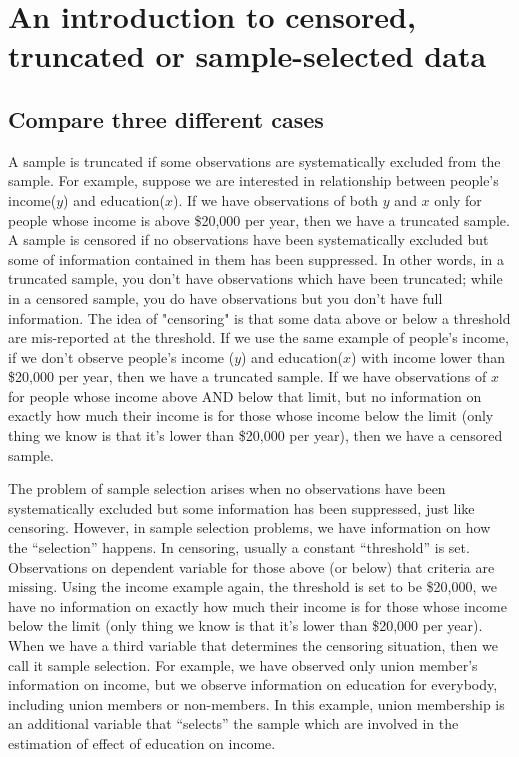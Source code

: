 \chapter{An introduction to censored, truncated or sample-selected data}

\section{Compare three different cases}


A sample is truncated if some observations are systematically excluded
from the sample.  For example, suppose we are interested in
relationship between people's income($y$) and education($x$).  If we
have observations of both $y$ and $x$ only for people whose income is
above \$20,000 per year, then we have a truncated sample.  A sample is
censored if no observations have been systematically excluded but some
of information contained in them has been suppressed.  In other words,
in a truncated sample, you don't have observations which have been
truncated; while in a censored sample, you do have observations but
you don't have full information.  The idea of "censoring" is that some
data above or below a threshold are mis-reported at the threshold.  If
we use the same example of people's income, if we don't observe
people's income ($y$) and education($x$) with income lower than
\$20,000 per year, then we have a truncated sample.  If we have
observations of $x$ for people whose income above AND below that
limit, but no information on exactly how much their income is for
those whose income below the limit (only thing we know is that it's
lower than \$20,000 per year), then we have a censored sample.



The problem of sample selection arises when no observations have been
systematically excluded but some information has been suppressed, just
like censoring.  However, in sample selection problems, we have
information on how the ``selection'' happens.  In censoring, usually a
constant ``threshold'' is set.  Observations on dependent variable for
those above (or below) that criteria are missing. Using the income
example again, the threshold is set to be \$20,000, we have no
information on exactly how much their income is for those whose income
below the limit (only thing we know is that it's lower than \$20,000
per year).  When we have a third variable that determines the
censoring situation, then we call it sample selection.  For example,
we have observed only union member's information on income, but we
observe information on education for everybody, including union
members or non-members.  In this example, union membership is an
additional variable that ``selects'' the sample which are involved in
the estimation of effect of education on income.

